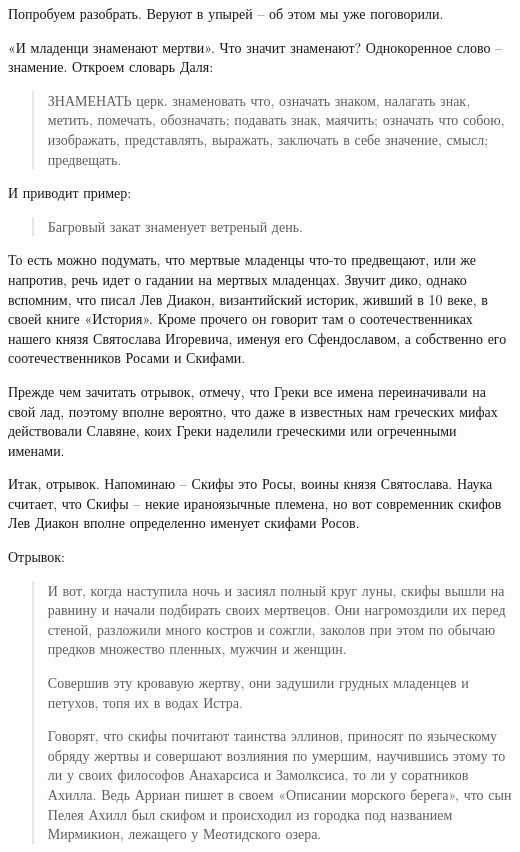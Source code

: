 \documentclass[a5paper,11pt,openany]{article}
\begin{document}
Попробуем разобрать. Веруют в упырей – об этом мы уже поговорили. 

«И младенци знаменают мертви». Что значит знаменают? Однокоренное слово – знамение. Откроем словарь Даля:

\begin{quotation}
\noindent ЗНАМЕНАТЬ церк. знаменовать что,  означать знаком, налагать знак, метить, помечать, обозначать; подавать знак, маячить;  означать что собою, изображать, представлять, выражать, заключать в себе значение,
смысл;  предвещать.   
\end{quotation}

И приводит пример:

\begin{quotation}
\noindent Багровый закат знаменует ветреный день.
\end{quotation}

То есть можно подумать, что мертвые младенцы что-то предвещают, или же напротив, речь идет о гадании на мертвых младенцах. Звучит дико, однако вспомним, что писал Лев Диакон, византийский историк, живший в 10 веке, в своей книге «История». Кроме прочего он говорит там о соотечественниках нашего князя Святослава Игоревича, именуя его Сфендославом, а собственно его соотечественников Росами и Скифами. 

Прежде чем зачитать отрывок, отмечу, что Греки все имена переиначивали на свой лад, поэтому вполне вероятно, что даже в известных нам греческих мифах действовали Славяне, коих Греки наделили греческими или огреченными именами.

   Итак, отрывок. Напоминаю – Скифы это Росы, воины князя Святослава. Наука считает, что Скифы – некие ираноязычные племена, но вот современник скифов Лев Диакон вполне определенно именует скифами Росов.

   Отрывок:

\begin{quotation}
\noindent И вот, когда наступила ночь и засиял полный круг луны, скифы вышли на равнину и начали подбирать своих мертвецов. Они нагромоздили их перед стеной, разложили много костров и сожгли, заколов при этом по обычаю предков множество пленных, мужчин и женщин.

Совершив эту кровавую жертву, они задушили грудных младенцев и петухов, топя их в водах Истра. 

Говорят, что скифы почитают таинства эллинов, приносят по языческому обряду жертвы и совершают возлияния по умершим, научившись этому то ли у своих философов Анахарсиса и Замолксиса, то ли у соратников Ахилла. Ведь Арриан пишет в своем «Описании морского берега», что сын Пелея Ахилл был скифом и происходил из городка под названием Мирмикион, лежащего у Меотидского озера. \end{quotation}
\end{document}
